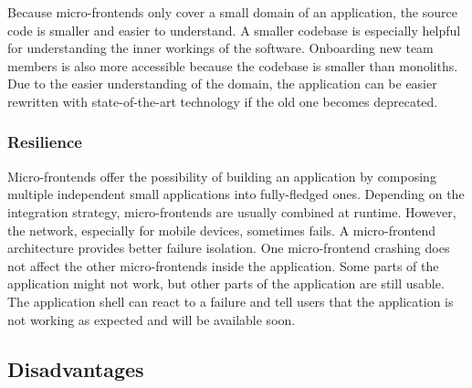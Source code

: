 Because micro-frontends only cover a small domain of an application, the source code is smaller and easier to understand. A smaller codebase is especially helpful for understanding the inner workings of the software. Onboarding new team members is also more accessible because the codebase is smaller than monoliths.
Due to the easier understanding of the domain, the application can be easier rewritten with state-of-the-art technology if the old one becomes deprecated. \cite{book:2020:geers:background:micro-frontends:micro-frontends-in-action}

\subsubsection{Resilience}\label{subsubsection:background:micro-frontend-resilience}

Micro-frontends offer the possibility of building an application by composing multiple independent small applications into fully-fledged ones. Depending on the integration strategy, micro-frontends are usually combined at runtime. However, the network, especially for mobile devices, sometimes fails. A micro-frontend architecture provides better failure isolation. One micro-frontend crashing does not affect the other micro-frontends inside the application. Some parts of the application might not work, but other parts of the application are still usable. The application shell can react to a failure and tell users that the application is not working as expected and will be available soon. \cite[10-11]{article:2021:perltonen:background:micro-frontends:motivations-benefits-and-issues}

\subsection{Disadvantages}\label{subsection:background:micro-frontend-downsides}


